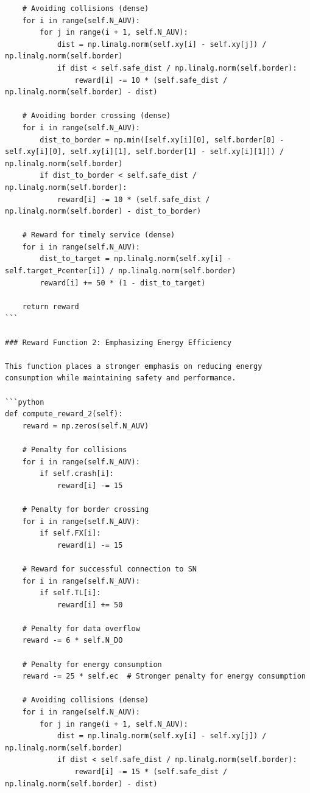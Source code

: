 \documentclass{article}
\begin{document}
\begin{verbatim}
    # Avoiding collisions (dense)
    for i in range(self.N_AUV):
        for j in range(i + 1, self.N_AUV):
            dist = np.linalg.norm(self.xy[i] - self.xy[j]) / np.linalg.norm(self.border)
            if dist < self.safe_dist / np.linalg.norm(self.border):
                reward[i] -= 10 * (self.safe_dist / np.linalg.norm(self.border) - dist)

    # Avoiding border crossing (dense)
    for i in range(self.N_AUV):
        dist_to_border = np.min([self.xy[i][0], self.border[0] - self.xy[i][0], self.xy[i][1], self.border[1] - self.xy[i][1]]) / np.linalg.norm(self.border)
        if dist_to_border < self.safe_dist / np.linalg.norm(self.border):
            reward[i] -= 10 * (self.safe_dist / np.linalg.norm(self.border) - dist_to_border)

    # Reward for timely service (dense)
    for i in range(self.N_AUV):
        dist_to_target = np.linalg.norm(self.xy[i] - self.target_Pcenter[i]) / np.linalg.norm(self.border)
        reward[i] += 50 * (1 - dist_to_target)

    return reward
```

### Reward Function 2: Emphasizing Energy Efficiency

This function places a stronger emphasis on reducing energy consumption while maintaining safety and performance.

```python
def compute_reward_2(self):
    reward = np.zeros(self.N_AUV)
    
    # Penalty for collisions
    for i in range(self.N_AUV):
        if self.crash[i]:
            reward[i] -= 15

    # Penalty for border crossing
    for i in range(self.N_AUV):
        if self.FX[i]:
            reward[i] -= 15

    # Reward for successful connection to SN
    for i in range(self.N_AUV):
        if self.TL[i]:
            reward[i] += 50

    # Penalty for data overflow
    reward -= 6 * self.N_DO

    # Penalty for energy consumption
    reward -= 25 * self.ec  # Stronger penalty for energy consumption

    # Avoiding collisions (dense)
    for i in range(self.N_AUV):
        for j in range(i + 1, self.N_AUV):
            dist = np.linalg.norm(self.xy[i] - self.xy[j]) / np.linalg.norm(self.border)
            if dist < self.safe_dist / np.linalg.norm(self.border):
                reward[i] -= 15 * (self.safe_dist / np.linalg.norm(self.border) - dist)


\end{verbatim}
\end{document}

